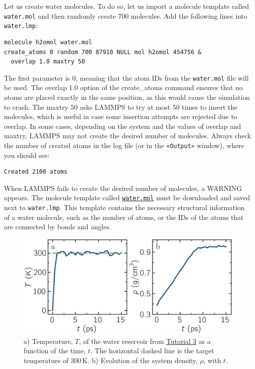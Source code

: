 \documentclass[9pt,tutorial]{livecoms}
\newcommand{\lmpcmd}[1]{\hspace{0pt}\colorbox{listing}{\textcolor{command}{\small{#1}}}\hspace{0pt}} %
\newcommand{\flecmd}[1]{\textcolor{command}{\texttt{#1}}} %
\newcommand{\guicmd}[1]{\textcolor{command}{\texttt{«#1»}}} %
\newcommand{\dwlcmd}[1]{\textcolor{download}{\texttt{#1}}} %
\newcommand{\filepath}{https://raw.githubusercontent.com/lammpstutorials/lammpstutorials-article/main/files/}
\begin{document}
Let us create water molecules.  To do so, let us import a molecule template called
\flecmd{water.mol} and then randomly create 700 molecules.  Add the following
lines into \flecmd{water.lmp}:
\begin{lstlisting}
molecule h2omol water.mol
create_atoms 0 random 700 87910 NULL mol h2omol 454756 &
  overlap 1.0 maxtry 50
\end{lstlisting}
{\color{blue}The first parameter is 0, meaning that the atom IDs from
the \flecmd{water.mol} file will be used.}
The \lmpcmd{overlap 1.0} option of the \lmpcmd{create\_atoms} command ensures
that no atoms are placed exactly in the same position, as this would cause the
simulation to crash.  The \lmpcmd{maxtry 50} asks LAMMPS to try at most 50 times
to insert the molecules, which is useful in case some insertion attempts are
rejected due to overlap.  In some cases, depending on the system and the values
of \lmpcmd{overlap} and \lmpcmd{maxtry}, LAMMPS may not create the desired number
of molecules.  Always check the number of created atoms in the \lmpcmd{log} file
(or in the \guicmd{Output} window), where you should see:
\begin{lstlisting}
Created 2100 atoms
\end{lstlisting}
When LAMMPS fails to create the desired number of molecules, a WARNING
appears.  The molecule template called
%
\href{\filepath tutorial3/water.mol}{\dwlcmd{water.mol}}
%
must be downloaded and saved
next to \flecmd{water.lmp}.  This template contains the necessary
structural information of a water molecule, such as the number of atoms,
or the IDs of the atoms that are connected by bonds and angles.

\begin{figure}
\centering
\includegraphics[width=\linewidth]{PEG-density}
\caption{a) Temperature, $T$, of the water reservoir from \hyperref[all-atom-label]{Tutorial 3}
as a function of the time, $t$.  The horizontal dashed line is the target temperature of 300\,K.
b) Evolution of the system density, $\rho$, with $t$.}
\label{fig:PEG-density}
\end{figure}
\end{document}
